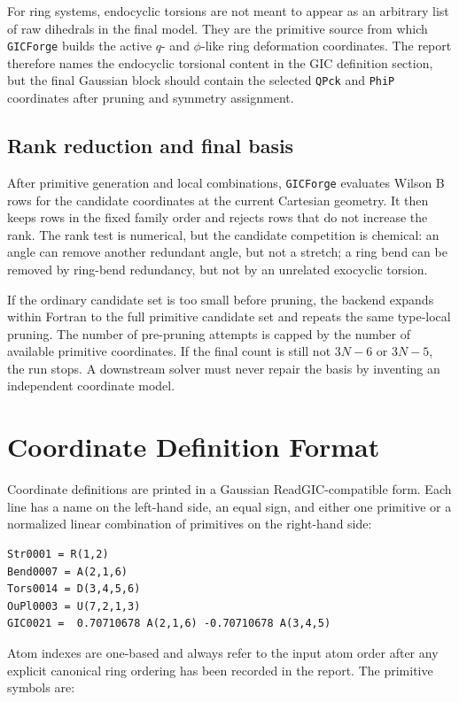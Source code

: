 \documentclass[11pt]{article}
\newcommand{\program}{\texttt{GICForge}}
\begin{document}
For ring systems, endocyclic torsions are not meant to appear as an arbitrary
list of raw dihedrals in the final model.  They are the primitive source from
which \program{} builds the active \(q\)- and \(\phi\)-like ring deformation
coordinates.  The report therefore names the endocyclic torsional content in
the GIC definition section, but the final Gaussian block should contain the
selected \texttt{QPck} and \texttt{PhiP} coordinates after pruning and symmetry
assignment.

\subsection{Rank reduction and final basis}

After primitive generation and local combinations, \program{} evaluates Wilson
B rows for the candidate coordinates at the current Cartesian geometry.  It then
keeps rows in the fixed family order and rejects rows that do not increase the
rank.  The rank test is numerical, but the candidate competition is chemical:
an angle can remove another redundant angle, but not a stretch; a ring bend can
be removed by ring-bend redundancy, but not by an unrelated exocyclic torsion.

If the ordinary candidate set is too small before pruning, the backend expands
within Fortran to the full primitive candidate set and repeats the same
type-local pruning.  The number of pre-pruning attempts is capped by the number
of available primitive coordinates.  If the final count is still not \(3N-6\)
or \(3N-5\), the run stops.  A downstream solver must never repair the basis by
inventing an independent coordinate model.

\section{Coordinate Definition Format}

Coordinate definitions are printed in a Gaussian ReadGIC-compatible form.  Each
line has a name on the left-hand side, an equal sign, and either one primitive
or a normalized linear combination of primitives on the right-hand side:

\begin{lstlisting}[style=merlino]
Str0001 = R(1,2)
Bend0007 = A(2,1,6)
Tors0014 = D(3,4,5,6)
OuPl0003 = U(7,2,1,3)
GIC0021 =  0.70710678 A(2,1,6) -0.70710678 A(3,4,5)
\end{lstlisting}

\noindent
Atom indexes are one-based and always refer to the input atom order after any
explicit canonical ring ordering has been recorded in the report.  The
primitive symbols are:
\end{document}
